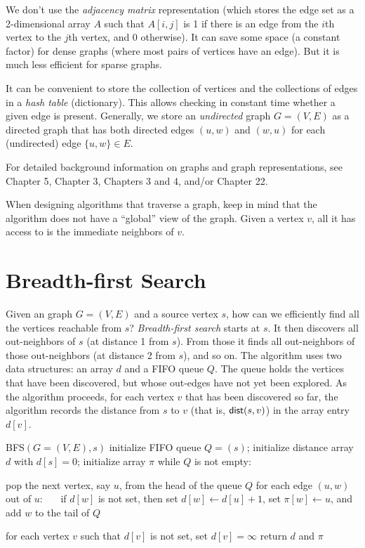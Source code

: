 \documentclass[11pt]{article}
\begin{document}
We don't use the \emph{adjacency matrix} representation (which stores the edge set as a 2-dimensional array $A$ such that $A[i,j]$ is 1 if there is an edge from the $i$th vertex to the $j$th vertex, and 0 otherwise).  It can save some space (a constant factor) for dense graphs (where most pairs of vertices have an edge). But it is much less efficient for sparse graphs.

It can be convenient to store the collection of vertices
and the collections of edges in a \emph{hash table} (dictionary).
This allows checking in constant time whether a given edge is present.
Generally, we store an \emph{undirected} graph $G=(V,E)$ as a directed graph
that has both directed edges $(u,w)$ and $(w,u)$ for each (undirected) edge $\{u,w\}\in E$.

For detailed background information on graphs and graph representations, see \JE Chapter 5, \KT Chapter 3, \DPV Chapters 3 and 4, and/or \CLRS Chapter 22.  

When designing algorithms that traverse a graph, keep in mind that the algorithm does not have a ``global'' view of the graph.  Given a vertex $v$, all it has access to is the immediate neighbors of $v$.  


\section{Breadth-first Search}\label{graphs: sec: BFS}

Given an graph $G=(V,E)$ and a source vertex $s$,
how can we efficiently find all the vertices reachable from $s$?
\emph{Breadth-first search} starts at $s$.
It then discovers all out-neighbors of $s$ (at distance 1 from $s$).
From those it finds all out-neighbors of those out-neighbors (at distance 2 from $s$), and so on.
The algorithm uses two data structures:
an array $d$ and a FIFO queue $Q$.
The queue holds the vertices that have been discovered,
but whose out-edges have not yet been explored.
As the algorithm proceeds, for each vertex $v$ that has been discovered so far,
the algorithm records the distance from $s$ to $v$ (that is, $\operatorname{\sf dist}(s, v)$)
in the array entry $d[v]$.  

\begin{myframed}
\begin{steps}
  \item[] {\sf BFS}$(G=(V,E), s)$ 
  \step initialize FIFO queue $Q=(s)$;  initialize distance array $d$ with $d[s] = 0$; initialize array $\pi$
  \step while $Q$ is not empty:
  \begin{block}
    \step pop the next vertex, say $u$, from the head of the queue $Q$
    \step for each edge $(u, w)$ out of $u$:
    \step~~~if $d[w]$ is not set, then set $d[w] \gets d[u]+1$, set $\pi[w]\gets u$, and add $w$ to the tail of $Q$
  \end{block}
  \step for each vertex $v$ such that $d[v]$ is not set, set $d[v] = \infty$
  \step return $d$ and $\pi$
\end{steps}
\end{myframed}
\end{document}
